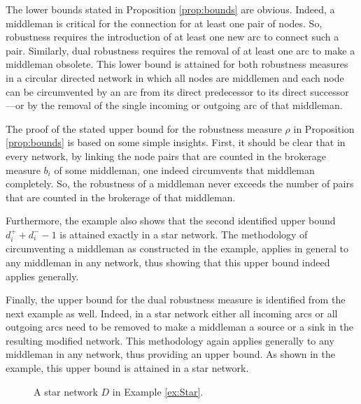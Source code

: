 \noindent
The lower bounds stated in Proposition \ref{prop:bounds} are obvious. Indeed, a middleman is critical for the connection for at least one pair of nodes. So, robustness requires the introduction of at least one new arc to connect such a pair. Similarly, dual robustness requires the removal of at least one arc to make a middleman obsolete. This lower bound is attained for both robustness measures in a circular directed network in which all nodes are middlemen and each node can be circumvented by an arc from its direct predecessor to its direct successor---or by the removal of the single incoming or outgoing arc of that middleman.

The proof of the stated upper bound for the robustness measure $\rho$ in Proposition \ref{prop:bounds} is based on some simple insights. First, it should be clear that in every network, by linking the node pairs that are counted in the brokerage measure $b_i$ of some middleman, one indeed circumvents that middleman completely. So, the robustness of a middleman never exceeds the number of pairs that are counted in the brokerage of that middleman.

Furthermore, the example also shows that the second identified upper bound $d^+_i + d^-_i -1$ is attained exactly in a star network. The methodology of circumventing a middleman as constructed in the example, applies in general to any middleman in any network, thus showing that this upper bound indeed applies generally.

Finally, the upper bound for the dual robustness measure is identified from the next example as well. Indeed, in a star network either all incoming arcs or all outgoing arcs need to be removed to make a middleman a source or a sink in the resulting modified network. This methodology again applies generally to any middleman in any network, thus providing an upper bound. As shown in the example, this upper bound is attained in a star network.

\begin{figure}[h]
\begin{center}
\end{center}
\caption{A star network $D$ in Example \ref{ex:Star}.}
\label{fig:Star}
\end{figure}

